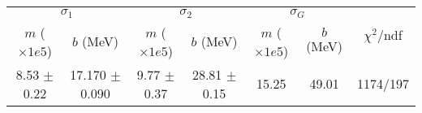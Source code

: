 \begin{tabular}{cc|cc|cc||c}
\multicolumn{2}{c|}{$\sigma_1$} & \multicolumn{2}{|c}{$\sigma_2$} & \multicolumn{2}{|c}{$\sigma_G$}  & \multirow{2}{*}{$\chi^2/$ndf}\\
$m$ ($\times1e5$) & $b$ (MeV) & $m$ ($\times1e5$) & $b$ (MeV) & $m$ ($\times1e5$) & $b$ (MeV) & \\
\hline
8.53 $\pm$ 0.22 & 17.170 $\pm$ 0.090 & 9.77 $\pm$ 0.37 & 28.81 $\pm$ 0.15 & 15.25 & 49.01 & 1174/197\\
\end{tabular}
